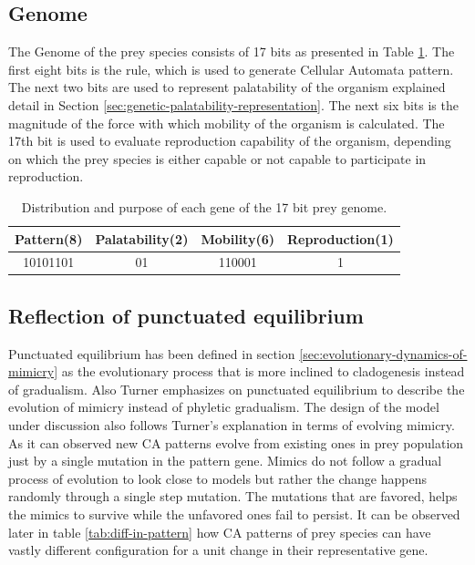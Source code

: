 \subsection{Genome}
The Genome of the prey species consists of 17 bits as presented in Table \ref{tab:prey-genome}. The first eight bits is the rule, which is used to generate Cellular Automata pattern. The next two bits are used to represent palatability of the organism explained detail in Section \ref{sec:genetic-palatability-representation}. The next six bits is the magnitude of the force with which mobility of the organism is calculated. The 17th bit is used to evaluate reproduction capability of the organism, depending on which the prey species is either capable or not capable to participate in reproduction.

\begin{table}[H]
\centering
\begin{tabular}{|c|c|c|c|}
	\hline
		\textbf{Pattern(8)} & \textbf{Palatability(2)} & \textbf{Mobility(6)} & \textbf{Reproduction(1)} \\ \hline
		10101101					 	& 							01		 		 & 			110001					&					1						 		 \\ \hline
\end{tabular}
\caption{Distribution and purpose of each gene of the 17 bit prey genome.}
\label{tab:prey-genome}
\end{table}

\subsection{Reflection of punctuated equilibrium}
\label{subsec:reflection-of-punctuated-equilibrium}
Punctuated equilibrium has been defined in section \ref{sec:evolutionary-dynamics-of-mimicry} as the evolutionary process that is more inclined to cladogenesis instead of gradualism. Also Turner \cite{turner1988} emphasizes on punctuated equilibrium to describe the evolution of mimicry instead of phyletic gradualism. The design of the model under discussion also follows Turner's explanation in terms of evolving mimicry. As it can observed new CA patterns evolve from existing ones in prey population just by a single mutation in the pattern gene. Mimics do not follow a gradual process of evolution to look close to models but rather the change happens randomly through a single step mutation. The mutations that are favored, helps the mimics to survive while the unfavored ones fail to persist. It can be observed later in table \ref{tab:diff-in-pattern} how CA patterns of prey species can have vastly different configuration for a unit change in their representative gene. 

